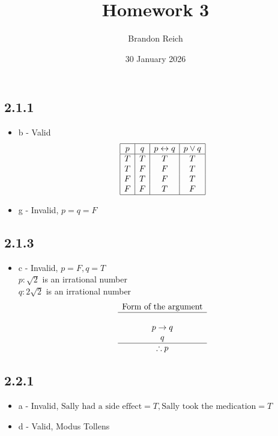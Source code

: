 \documentclass{article}
\title{Homework 3}
\author{Brandon Reich}
\date{30 January 2026}
\begin{document}
\maketitle

\subsection*{2.1.1}
\begin{itemize}
    \item b - Valid
    $$
        \begin{array}{|c|c|c|c|}
            \hline
            p & q & p \leftrightarrow q & p \lor q \\
            \hline
            T & T & T & T \\
            T & F & F & T \\
            F & T & F & T \\
            F & F & T & F \\
            \hline
        \end{array}
    $$
    \item g - Invalid, $p=q=F$
\end{itemize}

\subsection*{2.1.3}
\begin{itemize}
    \item c - Invalid, $p=F, q=T$ \\
    
    $p: \sqrt{2}$ is an irrational number \\
    $q: 2\sqrt{2}$ is an irrational number
    $$
        \begin{array}{c}
            \text{Form of the argument} \\
            \hline \\
            p \rightarrow q \\
            q \\
            \hline 
            \therefore p \\
        \end{array}
    $$
\end{itemize}

\subsection*{2.2.1}
\begin{itemize}
    \item a - Invalid, $\text{Sally had a side effect}=T, \text{Sally took the medication}=T$
    \item d - Valid, Modus Tollens
\end{itemize}
\end{document}
